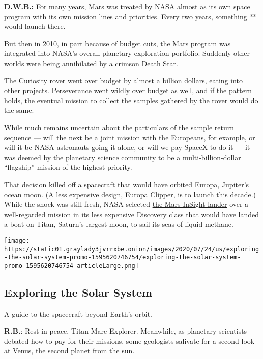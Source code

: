 \textbf{D.W.B.:} For many years, Mars was treated by NASA almost as its
own space program with its own mission lines and priorities. Every two
years, something ** would launch there.

But then in 2010, in part because of budget cuts, the Mars program was
integrated into NASA's overall planetary exploration portfolio. Suddenly
other worlds were being annihilated by a crimson Death Star.

The Curiosity rover went over budget by almost a billion dollars, eating
into other projects. Perseverance went wildly over budget as well, and
if the pattern holds, the
\href{https://www.nytimes3xbfgragh.onion/2020/07/28/science/mars-sample-return-mission.html}{eventual
mission to collect the samples gathered by the rover} would do the same.

While much remains uncertain about the particulars of the sample return
sequence --- will the next be a joint mission with the Europeans, for
example, or will it be NASA astronauts going it alone, or will we pay
SpaceX to do it --- it was deemed by the planetary science community to
be a multi-billion-dollar ``flagship'' mission of the highest priority.

That decision killed off a spacecraft that would have orbited Europa,
Jupiter's ocean moon. (A less expensive design, Europa Clipper, is to
launch this decade.) While the shock was still fresh, NASA selected
\href{https://www.nytimes3xbfgragh.onion/interactive/2018/05/01/science/mars-nasa-insight-ar-3d-ul.html}{the
Mars InSight lander} over a well-regarded mission in its less expensive
Discovery class that would have landed a boat on Titan, Saturn's largest
moon, to sail its seas of liquid methane.

\href{https://www.nytimes3xbfgragh.onion/interactive/2020/science/exploring-the-solar-system.html}{}

\texttt{[image: https://static01.graylady3jvrrxbe.onion/images/2020/07/24/us/exploring-the-solar-system-promo-1595620746754/exploring-the-solar-system-promo-1595620746754-articleLarge.png]}

\hypertarget{exploring-the-solar-system}{%
\subsection{Exploring the Solar
System}\label{exploring-the-solar-system}}

A guide to the spacecraft beyond Earth's orbit.

\textbf{R.B.}: Rest in peace, Titan Mare Explorer. Meanwhile, as
planetary scientists debated how to pay for their missions, some
geologists salivate for a second look at Venus, the second planet from
the sun.

